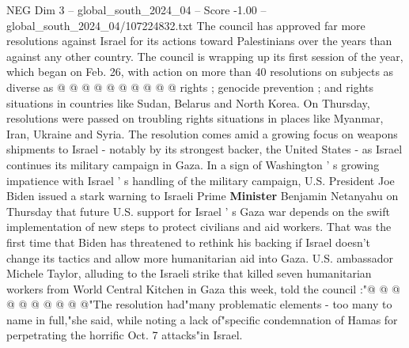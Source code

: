 \begin{textsample}{NEG Dim 3 – global\_south\_2024\_04 – Score -1.00 – global\_south\_2024\_04/107224832.txt}
The council has approved far more resolutions against Israel for its actions toward Palestinians over the years than against any other country.
The council is wrapping up its first session of the year, which began on Feb. 26, with action on more than 40 resolutions on subjects as diverse as @ @ @ @ @ @ @ @ @ @ rights ; genocide prevention ; and rights situations in countries like Sudan, Belarus and North Korea.
On Thursday, resolutions were passed on troubling rights situations in places like Myanmar, Iran, Ukraine and Syria.
The resolution comes amid a growing focus on weapons shipments to Israel - notably by its strongest backer, the United States - as Israel continues its military campaign in Gaza.
In a sign of Washington ' s growing impatience with Israel ' s handling of the military campaign, U.S.
President Joe Biden issued a stark warning to Israeli Prime \textbf{Minister} Benjamin Netanyahu on Thursday that future U.S. support for Israel ' s Gaza war depends on the swift implementation of new steps to protect civilians and aid workers.
That was the first time that Biden has threatened to rethink his backing if Israel doesn't change its tactics and allow more humanitarian aid into Gaza.
U.S. ambassador Michele Taylor, alluding to the Israeli strike that killed seven humanitarian workers from World Central Kitchen in Gaza this week, told the council :"@ @ @ @ @ @ @ @ @ @"The resolution had"many problematic elements - too many to name in full,"she said, while noting a lack of"specific condemnation of Hamas for perpetrating the horrific Oct. 7 attacks"in Israel.

\end{textsample}

